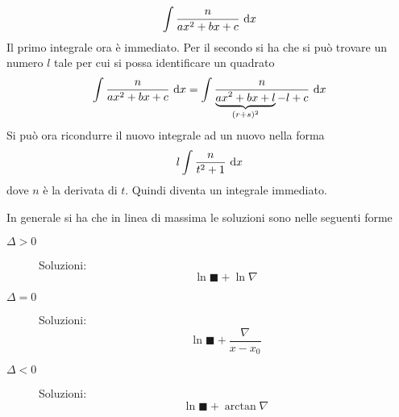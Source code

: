 \begin{description}
\begin{description}
\begin{equation*}
          \int \frac{n}{ax^2+bx+c}\,\mathop{}\!\mathrm{d} x
        \end{equation*}
        Il primo integrale ora è immediato. Per il secondo si ha che si può trovare un numero $l$ 
        tale per cui si possa identificare un quadrato
        \begin{equation*}
          \int \frac{n}{ax^2+bx+c}\,\mathop{}\!\mathrm{d} x = 
          \int\frac{n}{\underbrace{ax^2+bx+l}_{(r+s)^2}-l+c}\,\mathop{}\!\mathrm{d} x
        \end{equation*}
        Si può ora ricondurre il nuovo integrale ad un nuovo nella forma
        \begin{equation*}
          l\int \frac{n}{t^2+1}\,\mathop{}\!\mathrm{d} x
        \end{equation*}
        dove $n$ è la derivata di $t$. Quindi diventa un integrale immediato.
    \end{description}
    In generale si ha che in linea di massima le soluzioni sono nelle seguenti forme
    \begin{description}
      \item[$\Delta > 0$] Soluzioni:
        \begin{equation*}
          \ln \blacksquare + \ln\nabla
        \end{equation*}
      \item[$\Delta = 0$] Soluzioni:
        \begin{equation*}
          \ln\blacksquare + \frac{\nabla}{x-x_0}
        \end{equation*}
      \item[$\Delta < 0$] Soluzioni:
        \begin{equation*}
          \ln\blacksquare + \arctan\nabla
        \end{equation*}
    \end{description}
\end{description}

